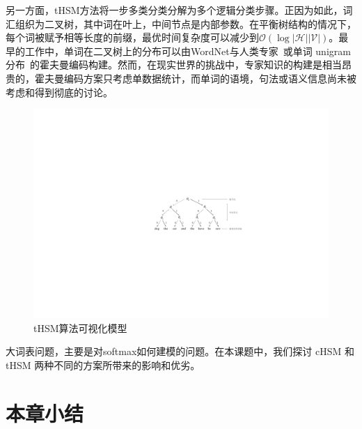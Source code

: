 另一方面，tHSM方法将一步多类分类分解为多个逻辑分类步骤。正因为如此，词汇组织为二叉树，其中词在叶上，中间节点是内部参数。在平衡树结构的情况下，每个词被赋予相等长度的前缀，最优时间复杂度可以减少到$\mathcal{O}(\log \mathcal{|H||V|})$。最早的工作中，单词在二叉树上的分布可以由WordNet与人类专家~或单词 unigram 分布~的霍夫曼编码构建。然而，在现实世界的挑战中，专家知识的构建是相当昂贵的，霍夫曼编码方案只考虑单数据统计，而单词的语境，句法或语义信息尚未被考虑和得到彻底的讨论。
\begin{figure}[!h]
  \centering
\includegraphics[width=0.9\linewidth]{./figures/thsm-example.pdf}
\caption{tHSM算法可视化模型}\label{fig:case_thsm}
\end{figure}


大词表问题，主要是对softmax如何建模的问题。在本课题中，我们探讨 cHSM 和 tHSM 两种不同的方案所带来的影响和优劣。
\section{本章小结}
